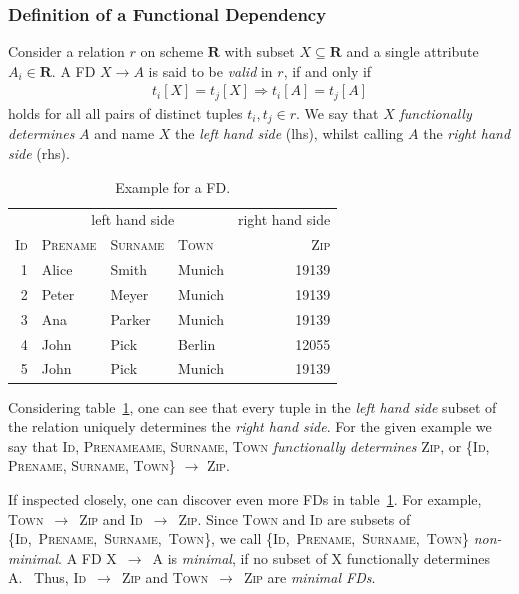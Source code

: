 \subsubsection{Definition of a Functional Dependency}
Consider a relation \(r\) on scheme \(\boldsymbol{R}\) with subset \(X \subseteq \boldsymbol{R}\) and a single attribute \(A_i \in \boldsymbol{R}\).
A FD \(X \to A\) is said to be \emph{valid} in \(r\), if and only if
\begin{align}
    t_i[X] = t_j[X] \Rightarrow t_i[A] = t_j[A] \label{eq:fd-condition}
\end{align}
holds for all all pairs of distinct tuples \(t_i,t_j \in r\).\cite[p.~21]{ABE19}
We say that \(X\) \emph{functionally determines} \(A\)\cite[p.~43]{MAI83} and name \(X\) the \emph{left hand side} (lhs), whilst calling \(A\) the \emph{right hand side} (rhs).

\begin{table}[ht]
    \centering
    \begin{tabular}{rlllr}
        \toprule
        & \multicolumn{3}{c}{left hand side} & \multicolumn{1}{c}{right hand side} \\ \cmidrule(lr{.25em}){1-4} \cmidrule(l{4.75em}){4-5}
        \textsc{Id} & \textsc{Prename} & \textsc{Surname} & \textsc{Town} & \textsc{Zip} \\
        \midrule
        1 & Alice & Smith & Munich & 19139 \\
        2 & Peter& Meyer & Munich & 19139 \\
        3 & Ana & Parker & Munich & 19139  \\
        4 & John & Pick & Berlin & 12055 \\
        5 & John & Pick & Munich & 19139 \\
        \bottomrule
    \end{tabular}
    \caption{Example for a FD.}\label{tab:fd-example}
\end{table}

Considering table~\ref{tab:fd-example}, one can see that every tuple in the \emph{left hand side} subset of the relation uniquely determines the \emph{right hand side}.
For the given example we say that \textsc{Id}, \textsc{Prenameame}, \textsc{Surname}, \textsc{Town} \emph{functionally determines} \textsc{Zip}, or \{\textsc{Id}, \textsc{Prename}, \textsc{Surname}, \textsc{Town}\} \( \rightarrow \) \textsc{Zip}.~\cite[p.~43]{MAI83}

If inspected closely, one can discover even more FDs in table~\ref{tab:fd-example}.
For example, \textsc{Town}~\( \rightarrow \)~\textsc{Zip} and \textsc{Id}~\( \rightarrow \)~\textsc{Zip}.
Since \textsc{Town} and \textsc{Id} are subsets of \{\textsc{Id},~\textsc{Prename},~\textsc{Surname},~\textsc{Town}\}, we call \{\textsc{Id},~\textsc{Prename},~\textsc{Surname},~\textsc{Town}\} \emph{non-minimal}.
A FD X~\( \rightarrow \)~A is \emph{minimal}, if no subset of X functionally determines A.~\cite[p.~2]{PAP15}
Thus, \textsc{Id}~\( \rightarrow \)~\textsc{Zip} and \textsc{Town}~\( \rightarrow \)~\textsc{Zip} are \emph{minimal FDs}.

